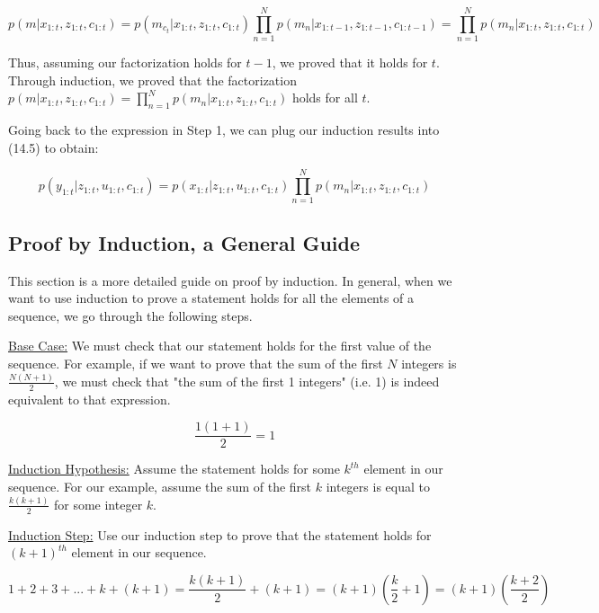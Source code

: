 \documentclass[twoside]{article}
\begin{document}
\begin{equation}
p(m|x_{1:t},z_{1:t},c_{1:t}) = p(m_{c_t}|x_{1:t},z_{1:t},c_{1:t})\prod_{n=1}^Np(m_n|x_{1:t-1},z_{1:t-1},c_{1:t-1})\nonumber = \prod_{n=1}^Np(m_n|x_{1:t},z_{1:t},c_{1:t})\nonumber
\end{equation}

Thus, assuming our factorization holds for $t-1$, we proved that it holds for $t$. Through induction, we proved that the factorization $p(m|x_{1:t},z_{1:t},c_{1:t}) = \prod_{n=1}^Np(m_n|x_{1:t},z_{1:t},c_{1:t})\nonumber$ holds for all $t$.

Going back to the expression in Step 1, we can plug our induction results into (14.5) to obtain:

\begin{equation}
p(y_{1:t}|z_{1:t},u_{1:t},c_{1:t}) = p(x_{1:t}|z_{1:t},u_{1:t},c_{1:t})\prod_{n=1}^Np(m_n|x_{1:t},z_{1:t},c_{1:t})\nonumber
\end{equation}

\subsection{Proof by Induction, a General Guide}
This section is a more detailed guide on proof by induction. In general, when we want to use induction to prove a statement holds for all the elements of a sequence, we go through the following steps.

\underline{Base Case:}
We must check that our statement holds for the first value of the sequence. For example, if we want to prove that the sum of the first $N$ integers is $\frac{N(N+1)}{2}$, we must check that "the sum of the first 1 integers" (i.e. 1) is indeed equivalent to that expression.

\begin{equation}
\frac{1(1+1)}{2} = 1
\end{equation}

\underline{Induction Hypothesis:}
Assume the statement holds for some $k^{th}$ element in our sequence. For our example, assume the sum of the first $k$ integers is equal to $\frac{k(k+1)}{2}$ for some integer $k$.

\underline{Induction Step:} Use our induction step to prove that the statement holds for $(k+1)^{th}$ element in our sequence.

\begin{equation}
1 + 2 + 3 +... + k + (k+1) = \frac{k(k+1)}{2} + (k+1) = (k+1)(\frac{k}{2} + 1) = (k+1)(\frac{k+2}{2})
\end{equation}
\end{document}
